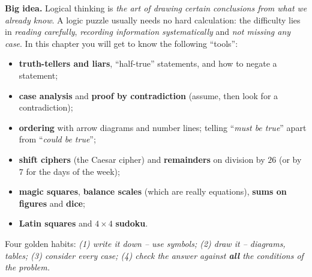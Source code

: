 \begin{knowbox}
\textbf{Big idea.} Logical thinking is \emph{the art of drawing certain conclusions from what we already know}. A logic puzzle
usually needs no hard calculation: the difficulty lies in \emph{reading carefully}, \emph{recording information systematically} and
\emph{not missing any case}. In this chapter you will get to know the following ``tools'':
\begin{itemize}[leftmargin=1.4em,itemsep=1pt,topsep=2pt]
  \item \textbf{truth-tellers and liars}, ``half-true'' statements, and how to negate a statement;
  \item \textbf{case analysis} and \textbf{proof by contradiction} (assume, then look for a contradiction);
  \item \textbf{ordering} with arrow diagrams and number lines; telling ``\emph{must be true}'' apart from ``\emph{could be true}'';
  \item \textbf{shift ciphers} (the Caesar cipher) and \textbf{remainders} on division by $26$ (or by $7$ for the days of the week);
  \item \textbf{magic squares}, \textbf{balance scales} (which are really equations), \textbf{sums on figures} and \textbf{dice};
  \item \textbf{Latin squares} and $4\times 4$ \textbf{sudoku}.
\end{itemize}
Four golden habits: \emph{(1) write it down -- use symbols; (2) draw it -- diagrams, tables; (3) consider every case; (4) check the
answer against \textbf{all} the conditions of the problem.}
\end{knowbox}
\vspace{0.3cm}

